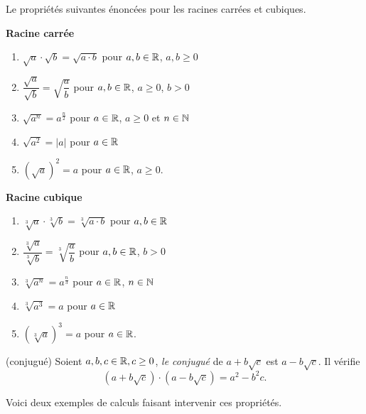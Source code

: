 \documentclass[a4paper,12pt]{report}
\begin{document}
\begin{proprietes}
Le propriétés suivantes énoncées pour les racines carrées et cubiques. 

\begin{minipage}[t]{0.5\textwidth}{
\vspace{0pt}
\begin{center}
	{\bfseries Racine carrée}
	\begin{enumerate}[label={\arabic*)}]
\item $\sqrt{a}\cdot \sqrt{b}=\sqrt{a\cdot b}$ pour $a,b\in \mathbb R$, $a,b\geq 0$
\item $\dfrac{\sqrt{a}}{\sqrt{b}}=\sqrt{\dfrac{a}{b}}$ pour $a,b\in \mathbb R$, $a\geq 0$, $b>0$
\item $\sqrt{a^n}=a^{\frac{n}{2}}$ pour $a\in \mathbb R$, $a\geq 0$ et $n\in \mathbb N$
\item $\sqrt{a^2}=\lvert a\rvert$ pour $a\in \mathbb R$
\item $(\sqrt{a})^2=a$ pour $a\in \mathbb R$, $a\geq 0$. 
\end{enumerate}
\end{center}

}
\end{minipage}
\begin{minipage}[t]{0.5\textwidth}{
\vspace{0pt}
{\bfseries Racine cubique}
\begin{center}
	\begin{enumerate}[label={\arabic*)}]
		\item $\sqrt[3]{a}\cdot \sqrt[3]{b}=\sqrt[3]{a\cdot b}$ pour $a,b\in \mathbb R$
		\item $\dfrac{\sqrt[3]{a}}{\sqrt[3]{b}}=\sqrt[3]{\dfrac{a}{b}}$ pour $a,b\in \mathbb R$, $b>0$
		\item $\sqrt[3]{a^n}=a^{\frac{n}{3}}$ pour $a\in \mathbb R$, $n\in \mathbb N$
		\item $\sqrt[3]{a^3}=a$ pour $a\in \mathbb R$
		\item $(\sqrt[3]{a})^3=a$ pour $a\in \mathbb R$. 
\end{enumerate}
\end{center}

}
\end{minipage}
\end{proprietes}
\begin{defi}(conjugué)
	Soient $a,b,c\in \mathbb R, c\geq 0$, \emph{le conjugué} de $a+b\sqrt{c}$ est $a-b\sqrt{c}$. Il vérifie \[(a+b\sqrt{c})\cdot (a-b\sqrt{c})=a^2-b^2c.\] 
\end{defi}

Voici deux exemples de calculs faisant intervenir ces propriétés.
\end{document}
